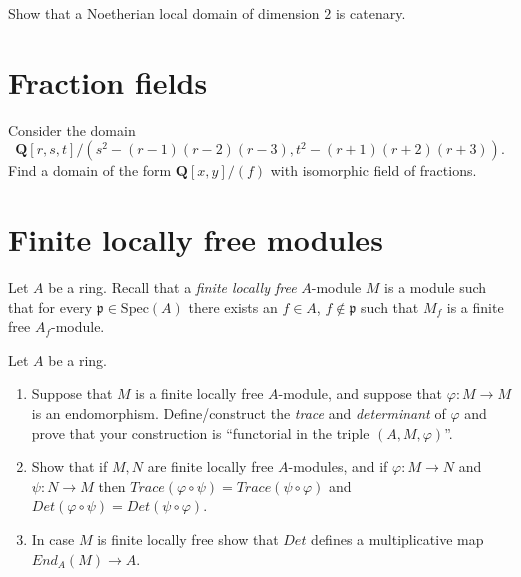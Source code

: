 \begin{exercise}
\label{exercise-Noetherian-local-domain-dim-2-catenary}
Show that a Noetherian local domain of dimension $2$ is catenary.
\end{exercise}




\section{Fraction fields}
\label{section-fraction-fields}

\begin{exercise}
\label{exercise-find-fraction-field}
Consider the domain
$$
{\mathbf Q}[r, s, t]/(s^2-(r-1)(r-2)(r-3), t^2-(r + 1)(r + 2)(r + 3)).
$$
Find a domain of the form ${\mathbf Q}[x, y]/(f)$ with isomorphic
field of fractions.
\end{exercise}




\section{Finite locally free modules}
\label{section-finite-locally-free}

\begin{definition}
\label{definition-finite-locally-free}
Let $A$ be a ring. Recall that a {\it finite locally free} $A$-module
$M$ is a module such that for every ${\mathfrak p} \in \text{Spec}(A)$
there exists an
$f\in A$, $f \not \in {\mathfrak p}$ such that $M_f$ is a finite free
$A_f$-module.
\end{definition}

\begin{exercise}
\label{exercise-trace-det}
Let $A$ be a ring.
\begin{enumerate}
\item Suppose that $M$ is a finite locally free $A$-module, and
suppose that $\varphi : M \to M$ is an endomorphism. Define/construct
the {\it trace}  and {\it determinant} of $\varphi$ and prove that your
construction is ``functorial in the triple $(A, M, \varphi)$''.
\item Show that if $M, N$ are finite locally free $A$-modules,
and if $\varphi : M \to N$ and $\psi : N \to M$ then
$Trace(\varphi \circ \psi) = Trace(\psi \circ \varphi)$ and
$Det(\varphi \circ \psi) = Det(\psi \circ \varphi)$.
\item In case $M$ is finite locally free show that
$Det$ defines a multiplicative map $End_A(M) \to A$.
\end{enumerate}
\end{exercise}

